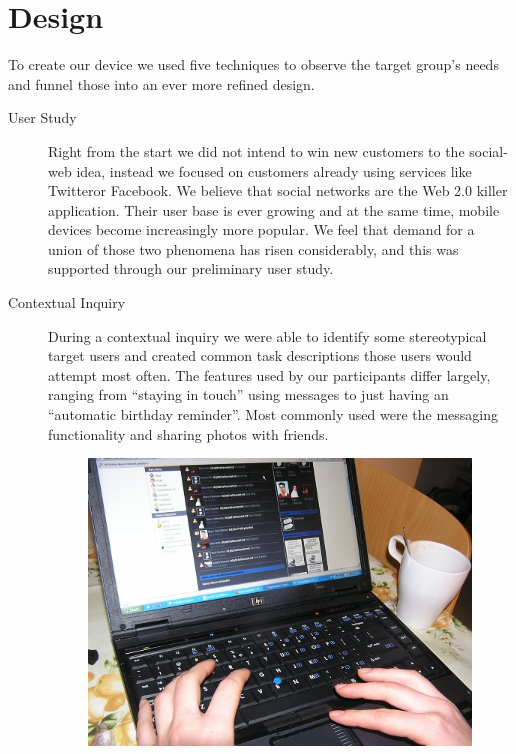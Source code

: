 %
%
%
\section{Design}
%
To create our device we used five techniques 
to observe the target group's needs and funnel those 
into an ever more refined design. 
\begin{description}
  \item[User Study] Right from the start we did not intend to win new customers to 
    the social-web idea, instead we focused on customers already 
    using services like Twitter\trademark or Facebook\registered. 
    We believe that social networks are the Web 2.0 killer application. 
    Their user base is ever growing and at the same time, mobile devices
    become increasingly more popular. We feel that demand for a union of 
    those two phenomena has risen considerably, and this was supported through our preliminary 
    user study.
  \item[Contextual Inquiry]
    During a contextual inquiry we were able to identify some stereotypical 
    target users and created common task descriptions those users would 
    attempt most often. The features used by our participants differ largely, ranging 
    from ``staying in touch'' using messages to just having an ``automatic 
    birthday reminder''. Most commonly used were the messaging functionality and
    sharing photos with friends.
\begin{figure}[h]
 \begin{center}
   \includegraphics[width=0.8\linewidth]{imgs/context.png}

\end{center}
\end{figure}
\end{description}
